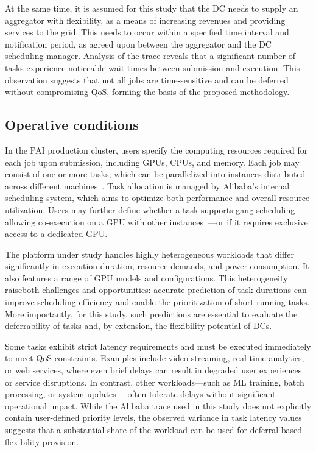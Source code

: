\documentclass[preprint,12pt]{elsarticle}
\makeatletter
\providecommand{\DIFaddtex}[1]{{\protect\color{blue}\uwave{#1}}} %
\providecommand{\DIFdeltex}[1]{{\protect\color{red}\sout{#1}}} %
\providecommand{\DIFaddbegin}{} %
\providecommand{\DIFaddend}{} %
\providecommand{\DIFdelbegin}{} %
\providecommand{\DIFdelend}{} %
\providecommand{\DIFadd}[1]{\texorpdfstring{\DIFaddtex{#1}}{#1}} %
\providecommand{\DIFdel}[1]{\texorpdfstring{\DIFdeltex{#1}}{}} %
\providecommand{\DIFscaledelfig}{0.5}
\newlength{\DIFdelgraphicswidth} %
\newlength{\DIFdelgraphicsheight} %
\providecommand{\DIFaddincludegraphics}[2][]{{\color{blue}\fbox{\DIFOincludegraphics[#1]{#2}}}} %
\providecommand{\DIFdelincludegraphics}[2][]{%
\sbox{\DIFdelgraphicsbox}{\DIFOincludegraphics[#1]{#2}}%
\settoboxwidth{\DIFdelgraphicswidth}{\DIFdelgraphicsbox} %
\settoboxtotalheight{\DIFdelgraphicsheight}{\DIFdelgraphicsbox} %
\scalebox{\DIFscaledelfig}{%
\parbox[b]{\DIFdelgraphicswidth}{\usebox{\DIFdelgraphicsbox}\\[-\baselineskip] \rule{\DIFdelgraphicswidth}{0em}}\llap{\resizebox{\DIFdelgraphicswidth}{\DIFdelgraphicsheight}{%
\setlength{\unitlength}{\DIFdelgraphicswidth}%
\begin{picture}(1,1)%
\thicklines\linethickness{2pt} %
{\color[rgb]{1,0,0}\put(0,0){\framebox(1,1){}}}%
{\color[rgb]{1,0,0}\put(0,0){\line( 1,1){1}}}%
{\color[rgb]{1,0,0}\put(0,1){\line(1,-1){1}}}%
\end{picture}%
}\hspace*{3pt}}} %
} %
\DeclareRobustCommand{\DIFaddbegin}{\DIFOaddbegin \let\includegraphics\DIFaddincludegraphics} %
\DeclareRobustCommand{\DIFaddend}{\DIFOaddend \let\includegraphics\DIFOincludegraphics} %
\DeclareRobustCommand{\DIFdelbegin}{\DIFOdelbegin \let\includegraphics\DIFdelincludegraphics} %
\DeclareRobustCommand{\DIFdelend}{\DIFOaddend \let\includegraphics\DIFOincludegraphics} %
\let\sout@orig\sout %
\renewcommand{\sout}[1]{\ifmmode\text{\sout@orig{\ensuremath{#1}}}\else\sout@orig{#1}\fi} %
\makeatother
\begin{document}
At the same time, it is assumed for this study that the DC needs to supply an aggregator with flexibility, as a means of increasing revenues and providing services to the grid. This needs to occur within a specified time interval and notification period, as agreed upon between the aggregator and the DC scheduling manager. Analysis of the trace reveals that a significant number of tasks experience noticeable wait times between submission and execution. This observation suggests that not all jobs are time-sensitive and can be deferred without compromising QoS, forming the basis of the proposed methodology.

\subsection{Operative conditions}

In the PAI production cluster, users specify the computing resources required for each job upon submission, including GPUs, CPUs, and memory. Each job may consist of one or more tasks, which can be parallelized into instances distributed across different machines~\cite{Weng2022}. Task allocation is managed by Alibaba’s internal scheduling system, which aims to optimize both performance and overall resource utilization. Users may further define whether a task supports gang scheduling\DIFdelbegin \DIFdel{—}\DIFdelend \DIFaddbegin \DIFadd{. }\DIFaddend allowing co-execution on a GPU with other instances~\cite{antMan}\DIFdelbegin \DIFdel{—}\DIFdelend \DIFaddbegin \DIFadd{, }\DIFaddend or if it requires exclusive access to a dedicated GPU.

The platform under study handles highly heterogeneous workloads that differ significantly in execution duration, resource demands, and power consumption. It also features a range of GPU models and configurations. This heterogeneity raise\DIFaddbegin \DIFadd{s}\DIFaddend  both challenges and opportunities: accurate prediction of task durations can improve scheduling efficiency and enable the prioritization of short-running tasks. More importantly, for this study, such predictions are essential to evaluate the deferrability of tasks and, by extension, the flexibility potential of DCs.

Some tasks exhibit strict latency requirements and must be executed immediately to meet QoS constraints. Examples include video streaming, real-time analytics, or web services, where even brief delays can result in degraded user experiences or service disruptions. In contrast, other workloads—such as ML training, batch processing, or system updates \DIFdelbegin \DIFdel{—}\DIFdelend often tolerate delays without significant operational impact. While the Alibaba trace used in this study does not explicitly contain user-defined priority levels, the observed variance in task latency values suggests that a substantial share of the workload can be used for deferral-based flexibility provision.
\end{document}
